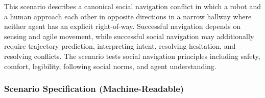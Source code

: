 \documentclass[utf8]{frontiers_suppmat} %
\begin{document}
This scenario describes a canonical social navigation conflict in which
a robot and a human approach each other in opposite directions in a
narrow hallway where neither agent has an explicit right-of-way.
Successful navigation depends on sensing and agile movement, while
successful social navigation may additionally require trajectory
prediction, interpreting intent, resolving hesitation, and resolving
conflicts. The scenario tests social navigation principles including
safety, comfort, legibility, following social norms, and agent
understanding.

\subsubsection{Scenario Specification
(Machine-Readable)}\label{scenario-specification-machine-readable}
\end{document}
